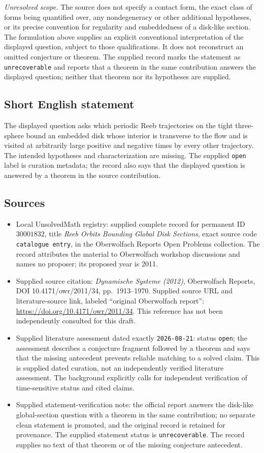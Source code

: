 \documentclass[11pt]{article}
\begin{document}
\emph{Unresolved scope.} The source does not specify a contact form, the exact class of forms being quantified over, any nondegeneracy or other additional hypotheses, or its precise convention for regularity and embeddedness of a disk-like section. The formulation above supplies an explicit conventional interpretation of the displayed question, subject to those qualifications. It does not reconstruct an omitted conjecture or theorem. The supplied record marks the statement as \texttt{unrecoverable} and reports that a theorem in the same contribution answers the displayed question; neither that theorem nor its hypotheses are supplied.
\subsection{Short English statement}
The displayed question asks which periodic Reeb trajectories on the tight three-sphere bound an embedded disk whose interior is transverse to the flow and is visited at arbitrarily large positive and negative times by every other trajectory. The intended hypotheses and characterization are missing. The supplied \texttt{open} label is curation metadata; the record also says that the displayed question is answered by a theorem in the source contribution.
\subsection{Sources}
\begin{itemize}
\item Local UnsolvedMath registry: supplied complete record for permanent ID \(30001832\), title \emph{Reeb Orbits Bounding Global Disk Sections}, exact source code \texttt{catalogue entry}, in the Oberwolfach Reports Open Problems collection. The record attributes the material to Oberwolfach workshop discussions and names no proposer; its proposed year is 2011.
\item Supplied source citation: \emph{Dynamische Systeme (2012)}, Oberwolfach Reports, DOI 10.4171/owr/2011/34, pp.\ 1913--1970. Supplied source URL and literature-source link, labeled ``original Oberwolfach report'': \url{https://doi.org/10.4171/owr/2011/34}. This reference has not been independently consulted for this draft.
\item Supplied literature assessment dated exactly \texttt{2026-08-21}: status \texttt{open}; the assessment describes a conjecture fragment followed by a theorem and says that the missing antecedent prevents reliable matching to a solved claim. This is supplied dated curation, not an independently verified literature assessment. The background explicitly calls for independent verification of time-sensitive status and cited claims.
\item Supplied statement-verification note: the official report answers the disk-like global-section question with a theorem in the same contribution; no separate clean statement is promoted, and the original record is retained for provenance. The supplied statement status is \texttt{unrecoverable}. The record supplies no text of that theorem or of the missing conjecture antecedent.
\end{itemize}
\end{document}

